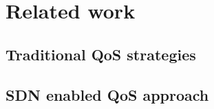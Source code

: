 \section{Related work}
\label{sect:related}
\subsection{Traditional QoS strategies}
\subsection{SDN enabled QoS approach}
